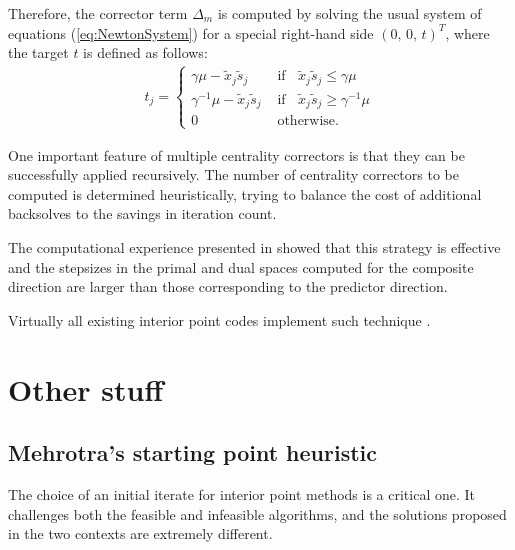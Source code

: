 Therefore, the corrector term $\Delta_m$ is computed by solving the usual 
system of equations (\ref{eq:NewtonSystem}) for a special right-hand side
$(0, \,0,\, t)^T$, where the target $t$ is defined as follows:
%
\begin{eqnarray} \label{Target}
  t_j = \left\{
  \begin{array}{ll}
    \gamma \mu - \tilde x_j \tilde s_j  
    & \mbox{ if } \;\; \tilde x_j \tilde s_j \leq \gamma \mu  \\
    \gamma^{-1} \mu - \tilde x_j \tilde s_j  
    & \mbox{ if } \;\; \tilde x_j \tilde s_j \geq \gamma^{-1} \mu  \\
    0    
    & \mbox{ otherwise.}
  \end{array}
  \right.
\end{eqnarray}


One important feature of multiple centrality correctors is that they
can be successfully applied recursively. 
The number of centrality correctors to be computed is determined 
heuristically, trying to balance the cost of additional backsolves to 
the savings in iteration count.


The computational experience presented in \cite{Gondzio96} showed 
that this strategy is effective and the stepsizes in the primal and 
dual spaces computed for the composite direction are larger than 
those corresponding to the predictor direction. 

Virtually all existing interior point codes implement such technique 
\cite[Appendix B]{ipm:Wright97}.


%
%
\section{Other stuff}

%
%
\subsection{Mehrotra's starting point heuristic}

The choice of an initial iterate for interior point methods is a
critical one. It challenges both the feasible and infeasible
algorithms, and the solutions proposed in the two contexts are
extremely different.

